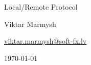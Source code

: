 \begin{titlepage}


\begin{center}
\LARGE

\vspace*{\fill}
\vspace*{\fill}

Local/Remote Protocol

\vspace*{\fill}

Viktar Marmysh


\href{mailto:viktar.marmysh@soft-fx.lv}{viktar.marmysh@soft-fx.lv}

\vspace*{\fill}
\today
\end{center}







\end{titlepage}
